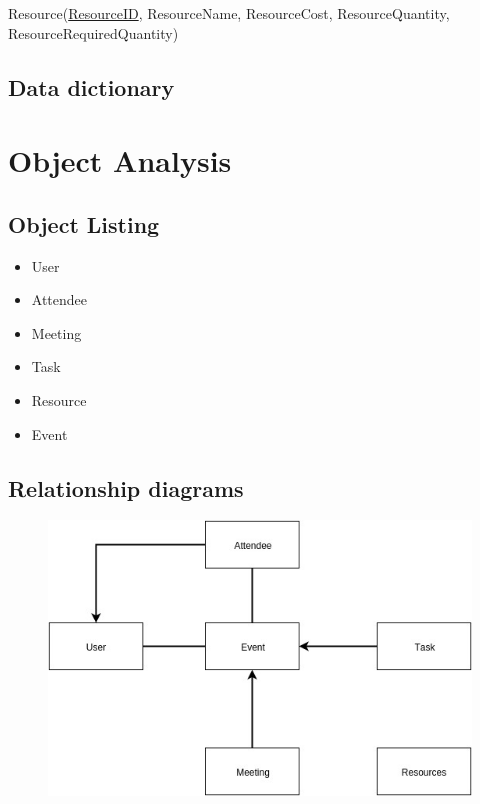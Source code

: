 Resource(\underline{ResourceID}, ResourceName, ResourceCost, ResourceQuantity, ResourceRequiredQuantity)

\subsection{Data dictionary}


\section{Object Analysis}

\subsection{Object Listing}

\begin{itemize}
	\item User
	\item Attendee
	\item Meeting
	\item Task
	\item Resource
	\item Event
\end{itemize}

\subsection{Relationship diagrams}

\begin{figure}[H]
	\includegraphics[width=\textwidth]{./Analysis/diagrams/orld.jpg}
\end{figure}


